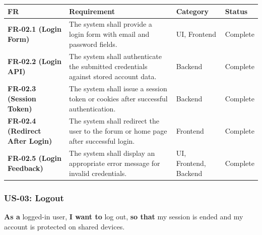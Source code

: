 \documentclass[12pt]{article}
\renewcommand{\baselinestretch}{1.5}
\begin{document}
\begingroup
\small
\renewcommand{\baselinestretch}{1.0}\selectfont
\renewcommand{\arraystretch}{1.15}
\setlength{\tabcolsep}{6pt}
\begin{longtable}{|>{\raggedright\arraybackslash}p{}|>{\raggedright\arraybackslash}p{}|>{\raggedright\arraybackslash}p{}|>{\raggedright\arraybackslash}p{}|}
\hline
\textbf{FR} & \textbf{Requirement} & \textbf{Category} & \textbf{Status} \\ \hline
\endhead
\textbf{FR-02.1 (Login Form)} & The system shall provide a login form with email and password fields. & UI, Frontend & Complete \\ \hline
\textbf{FR-02.2 (Login API)} & The system shall authenticate the submitted credentials against stored account data. & Backend & Complete \\ \hline
\textbf{FR-02.3 (Session Token)} & The system shall issue a session token or cookies after successful authentication. & Backend & Complete \\ \hline
\textbf{FR-02.4 (Redirect After Login)} & The system shall redirect the user to the forum or home page after successful login. & Frontend & Complete \\ \hline
\textbf{FR-02.5 (Login Feedback)} & The system shall display an appropriate error message for invalid credentials. & UI, Frontend, Backend & Complete \\ \hline
\end{longtable}
\endgroup
\par\medskip

\hypertarget{sec:us-03-logout}{}
\subsubsection*{US-03: Logout}
\par\medskip

\textbf{As a} logged-in user, \textbf{I want to} log out, \textbf{so that} my session is ended and my account is protected on shared devices.
\par\medskip
\end{document}
